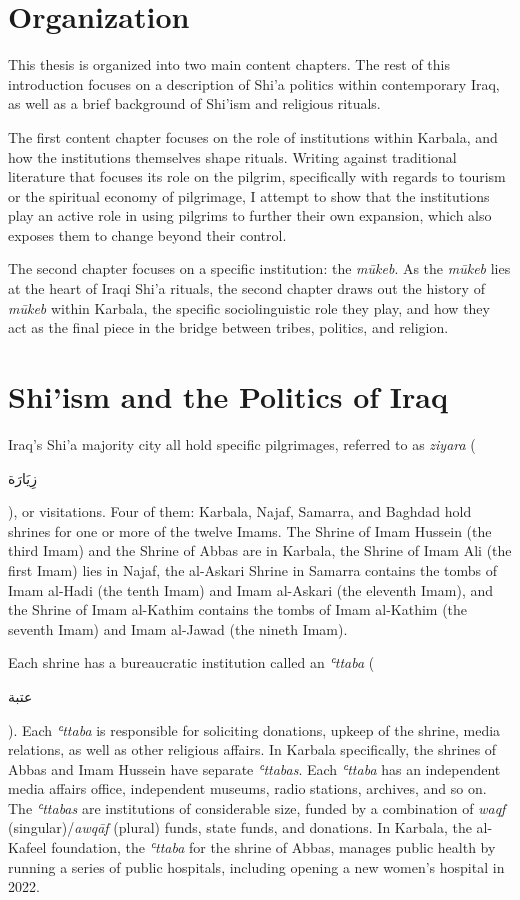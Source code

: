 \section{Organization}

This thesis is organized into two main content chapters. The rest of this introduction focuses on a description of Shi'a politics within contemporary Iraq, as well as a brief background of Shi'ism and religious rituals.

The first content chapter focuses on the role of institutions within Karbala, and how the institutions themselves shape rituals. Writing against traditional literature that focuses its role on the pilgrim, specifically with regards to tourism or the spiritual economy of pilgrimage, I attempt to show that the institutions play an active role in using pilgrims to further their own expansion, which also exposes them to change beyond their control. 

The second chapter focuses on a specific institution: the \emph{mūkeb}. As the \emph{mūkeb} lies at the heart of Iraqi Shi'a rituals, the second chapter draws out the history of \emph{mūkeb} within Karbala, the specific sociolinguistic role they play, and how they act as the final piece in the bridge between tribes, politics, and religion. 

\section{Shi'ism and the Politics of Iraq}
Iraq's Shi'a majority city all hold specific pilgrimages, referred to as \emph{ziyara} (\begin{Arabic}زِيَارَة\end{Arabic}), or visitations. Four of them: Karbala, Najaf, Samarra, and Baghdad hold shrines for one or more of the twelve Imams. The Shrine of Imam Hussein (the third Imam) and the Shrine of Abbas are in Karbala, the Shrine of Imam Ali (the first Imam) lies in Najaf, the al-Askari Shrine in Samarra contains the tombs of Imam al-Hadi (the tenth Imam) and Imam al-Askari (the eleventh Imam), and the Shrine of Imam al-Kathim contains the tombs of Imam al-Kathim (the seventh Imam) and Imam al-Jawad (the nineth Imam). 

Each shrine has a bureaucratic institution called an \emph{ʿttaba} (\begin{Arabic}عتبة\end{Arabic}). Each \emph{ʿttaba} is responsible for soliciting donations, upkeep of the shrine, media relations, as well as other religious affairs. In Karbala specifically, the shrines of Abbas and Imam Hussein have separate \emph{ʿttabas}. Each \emph{ʿttaba} has an independent media affairs office, independent museums, radio stations, archives, and so on. The \emph{ʿttabas} are institutions of considerable size, funded by a combination of \emph{waqf} (singular)/\emph{awqāf} (plural) funds, state funds, and donations. In Karbala, the al-Kafeel foundation, the \emph{ʿttaba} for the shrine of Abbas, manages public health by running a series of public hospitals, including opening a new women's hospital in 2022. 


